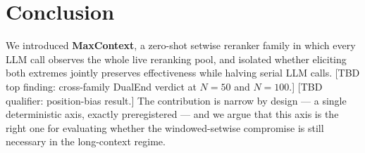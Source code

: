 \section{Conclusion}
\label{sec:conclusion}


We introduced \textbf{MaxContext}, a zero-shot setwise reranker family in which every LLM call observes the whole live reranking pool, and isolated whether eliciting both extremes jointly preserves effectiveness while halving serial LLM calls. [TBD top finding: cross-family DualEnd verdict at $N{=}50$ and $N{=}100$.] [TBD qualifier: position-bias result.] The contribution is narrow by design --- a single deterministic axis, exactly preregistered --- and we argue that this axis is the right one for evaluating whether the windowed-setwise compromise is still necessary in the long-context regime.
